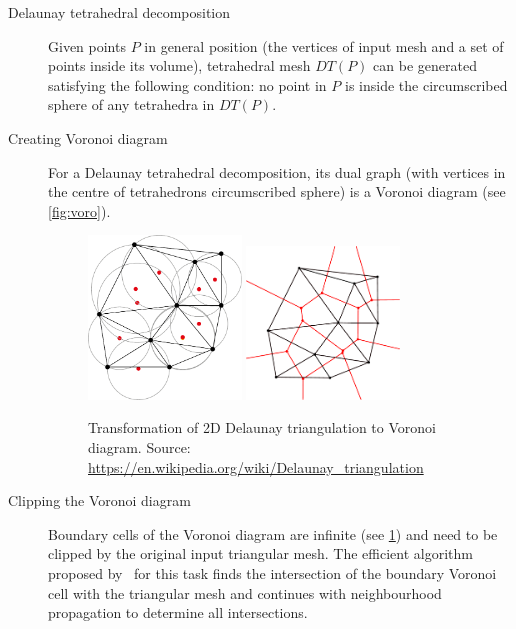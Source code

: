 \begin{description}
    \item[Delaunay tetrahedral decomposition] Given points $P$ in general position (the vertices of input mesh and a set of points inside its volume), tetrahedral mesh $DT(P)$ can be generated satisfying the following condition: no point in $P$ is inside the circumscribed sphere of any tetrahedra in $DT(P)$.
    \item[Creating Voronoi diagram] For a Delaunay tetrahedral decomposition, its dual graph (with vertices in the centre of tetrahedrons circumscribed sphere) is a Voronoi diagram (see \cref{fig:voro}).
    
 \begin{figure}
    \centering
    \includegraphics[width=0.4\textwidth]{img/delaunay}
    \includegraphics[width=0.4\textwidth]{img/voronoi}
    \caption{Transformation of 2D Delaunay triangulation to Voronoi diagram. Source: \url{https://en.wikipedia.org/wiki/Delaunay\_triangulation}}
    \label{fig:DT}
\end{figure}

    \item[Clipping the Voronoi diagram] Boundary cells of the Voronoi diagram are infinite (see \cref{fig:DT}) and need to be clipped by the original input triangular mesh. The efficient algorithm proposed by~\citet{yan2010efficient} for this task finds the intersection of the boundary Voronoi cell with the triangular mesh and continues with neighbourhood propagation to determine all intersections. 
\end{description}

